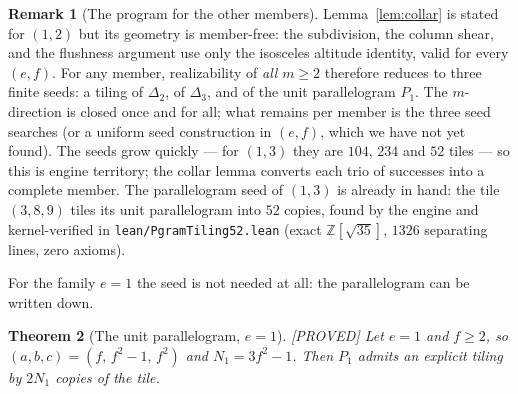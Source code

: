 \documentclass[11pt,reqno]{amsart}
\theoremstyle{plain}
\newtheorem{theorem}{Theorem}
\theoremstyle{definition}
\newtheorem{remark}[theorem]{Remark}
\newcommand{\Z}{\mathbb{Z}}
\newcommand{\lab}[1]{\hfill\textnormal{\footnotesize\textsc{[#1]}}}
\begin{document}
\begin{remark}[The program for the other members]\label{rem:collarprogram}
Lemma~\ref{lem:collar} is stated for $(1,2)$ but its geometry is member-free: the subdivision,
the column shear, and the flushness argument use only the isosceles altitude identity, valid for
every $(e,f)$. For any member, realizability of \emph{all} $m\ge2$ therefore reduces to three
finite seeds: a tiling of $\Delta_2$, of $\Delta_3$, and of the unit parallelogram $P_1$. The
$m$-direction is closed once and for all; what remains per member is the three seed searches (or
a uniform seed construction in $(e,f)$, which we have not yet found). The seeds grow quickly ---
for $(1,3)$ they are $104$, $234$ and $52$ tiles --- so this is engine territory; the collar
lemma converts each trio of successes into a complete member. The parallelogram seed of $(1,3)$
is already in hand: the tile $(3,8,9)$ tiles its unit parallelogram into $52$ copies, found by the
engine and kernel-verified in \textup{\texttt{lean/PgramTiling52.lean}} (exact $\Z[\sqrt{35}]$,
$1326$ separating lines, zero axioms).

For the family $e=1$ the seed is not needed at all: the parallelogram can be written down.
\end{remark}

\begin{theorem}[The unit parallelogram, $e=1$]\label{thm:pgram-e1}\lab{PROVED}
Let $e=1$ and $f\ge2$, so $(a,b,c)=(f,\,f^2-1,\,f^2)$ and $N_1=3f^2-1$. Then $P_1$ admits an
explicit tiling by $2N_1$ copies of the tile.
\end{theorem}
\end{document}
